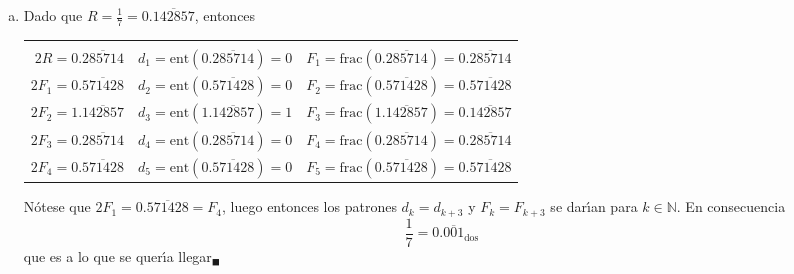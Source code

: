 \begin{solucion}
\begin{enumerate}[(a)]
  \item Dado que $R = \frac{1}{7} = 0.\overline{142857}$, entonces 
  \begin{center}
   \begin{tabular}{rcl}
    & \hspace{6cm} & \\
    $2R = 0.\overline{285714}$ & $d_1 = \text{ent}\left(0.\overline{285714}\right) = 0$ & $F_1 = \text{frac}\left(0.\overline{285714}\right) = 0.\overline{285714}$ \\
    $2F_1 = 0.\overline{571428}$ & $d_2 = \text{ent}\left(0.\overline{571428}\right) = 0$ & $F_2 = \text{frac}\left(0.\overline{571428}\right) = 0.\overline{571428}$ \\
    $2F_2 = 1.\overline{142857}$ & $d_3 = \text{ent}\left(1.\overline{142857}\right) = 1$ & $F_3 = \text{frac}\left(1.\overline{142857}\right) = 0.\overline{142857}$ \\
    $2F_3 = 0.\overline{285714}$ & $d_4 = \text{ent}\left(0.\overline{285714}\right) = 0$ & $F_4 = \text{frac}\left(0.\overline{285714}\right) = 0.\overline{285714}$ \\
    $2F_4 = 0.\overline{571428}$ & $d_5 = \text{ent}\left(0.\overline{571428}\right) = 0$ & $F_5 = \text{frac}\left(0.\overline{571428}\right) = 0.\overline{571428}$ \\
   \end{tabular}
  \end{center}
  N\'otese que $2F_1 = 0.\overline{571428} = F_4$, luego entonces los patrones $d_k = d_{k+3}$ y $F_k = F_{k+3}$ se dar\'{\i}an para $k \in \mathbb{N}$. En consecuencia
  \begin{equation*}
   \frac{1}{7} = 0.\overline{001}_{\text{dos}}
  \end{equation*}
  que es a lo que se quer\'{\i}a llegar${}_{\blacksquare}$
 \end{enumerate}
\end{solucion}
